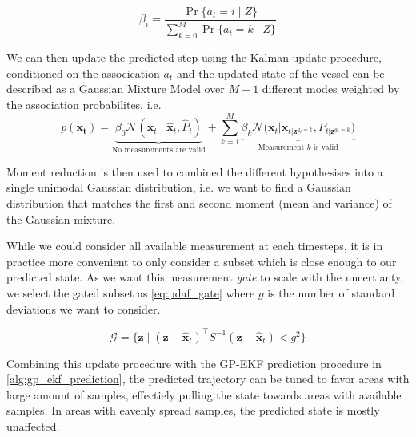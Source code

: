 \begin{equation}
    \beta_i = \frac{\Pr\{a_t=i \; | \; Z\}}{\sum_{k=0}^M \Pr\{a_t=k \; | \; Z\}}
\end{equation}

We can then update the predicted step using the Kalman update procedure, conditioned on the assocication $a_t$ and the updated state of the vessel can be described as a Gaussian Mixture Model over $M+1$ different modes weighted by the association probabilites, i.e. 
\begin{equation}
    p(\boldsymbol{x_t}) = \underbrace{\beta_0 \mathcal{N}(\boldsymbol{x}_t \; | \; \hat{\boldsymbol{x}}_t, \hat{P}_t)}_{\text{No measurements are valid}} + \sum_{k=1}^M \underbrace{\beta_k \mathcal{N}\big(\boldsymbol{x}_t | \boldsymbol{x}_{t | \boldsymbol{z}^{a_t=k}}, P_{t | \boldsymbol{z}^{a_t=k}}\big)}_{\text{Measurement $k$ is valid}}
\end{equation}

Moment reduction is then used to combined the different hypothesises into a single unimodal Gaussian distribution, i.e. we want to find a Gaussian distribution that matches the first and second moment (mean and variance) of the Gaussian mixture. 

While we could consider all available measurement at each timesteps, it is in practice more convenient to only consider a subset which is close enough to our predicted state. As we want this measurement \textit{gate} to scale with the uncertianty, we select the gated subset as \cref{eq:pdaf_gate} where $g$ is the number of standard deviations we want to consider.

\begin{equation} \label{eq:pdaf_gate}
    \mathcal{G} = \big\{ \boldsymbol{z} \; | \; (\boldsymbol{z} - \hat{\boldsymbol{x}}_t)^\intercal S^{-1} (\boldsymbol{z} - \hat{\boldsymbol{x}}_t) < g^2 \big\}
\end{equation}




Combining this update procedure with the GP-EKF prediction procedure in \cref{alg:gp_ekf_prediction}, the predicted trajectory can be tuned to favor areas with large amount of samples, effectiely pulling the state towards areas with available samples. In areas with eavenly spread samples, the predicted state is mostly unaffected.

